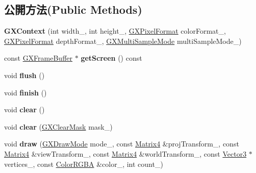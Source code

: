 \subsection*{公開方法(Public Methods)}
\begin{DoxyCompactItemize}
\item 
{\bfseries G\+X\+Context} (int width\+\_\+, int height\+\_\+, \hyperlink{class_i_dream_sky_1_1_g_x_pixel_format}{G\+X\+Pixel\+Format} color\+Format\+\_\+, \hyperlink{class_i_dream_sky_1_1_g_x_pixel_format}{G\+X\+Pixel\+Format} depth\+Format\+\_\+, \hyperlink{class_i_dream_sky_1_1_g_x_multi_sample_mode}{G\+X\+Multi\+Sample\+Mode} multi\+Sample\+Mode\+\_\+)\hypertarget{class_i_dream_sky_1_1_g_x_context_a4ec59eea395c067216c0245c6d486672}{}\label{class_i_dream_sky_1_1_g_x_context_a4ec59eea395c067216c0245c6d486672}

\item 
const \hyperlink{class_i_dream_sky_1_1_g_x_frame_buffer}{G\+X\+Frame\+Buffer} $\ast$ {\bfseries get\+Screen} () const \hypertarget{class_i_dream_sky_1_1_g_x_context_a49d48f7981f76fc3030700d9ee3e28ef}{}\label{class_i_dream_sky_1_1_g_x_context_a49d48f7981f76fc3030700d9ee3e28ef}

\item 
void {\bfseries flush} ()\hypertarget{class_i_dream_sky_1_1_g_x_context_a36462301294a68de6c99c3599e370ad0}{}\label{class_i_dream_sky_1_1_g_x_context_a36462301294a68de6c99c3599e370ad0}

\item 
void {\bfseries finish} ()\hypertarget{class_i_dream_sky_1_1_g_x_context_a9536ca0668294067af79fb6404b864de}{}\label{class_i_dream_sky_1_1_g_x_context_a9536ca0668294067af79fb6404b864de}

\item 
void {\bfseries clear} ()\hypertarget{class_i_dream_sky_1_1_g_x_context_aec5c070800c9b82965223c13ae810b88}{}\label{class_i_dream_sky_1_1_g_x_context_aec5c070800c9b82965223c13ae810b88}

\item 
void {\bfseries clear} (\hyperlink{class_i_dream_sky_1_1_g_x_clear_mask}{G\+X\+Clear\+Mask} mask\+\_\+)\hypertarget{class_i_dream_sky_1_1_g_x_context_aed4b8bad3ea948cc0168b48ecd020cf4}{}\label{class_i_dream_sky_1_1_g_x_context_aed4b8bad3ea948cc0168b48ecd020cf4}

\item 
void {\bfseries draw} (\hyperlink{class_i_dream_sky_1_1_g_x_draw_mode}{G\+X\+Draw\+Mode} mode\+\_\+, const \hyperlink{class_i_dream_sky_1_1_matrix4}{Matrix4} \&proj\+Transform\+\_\+, const \hyperlink{class_i_dream_sky_1_1_matrix4}{Matrix4} \&view\+Transform\+\_\+, const \hyperlink{class_i_dream_sky_1_1_matrix4}{Matrix4} \&world\+Transform\+\_\+, const \hyperlink{class_i_dream_sky_1_1_vector3}{Vector3} $\ast$vertices\+\_\+, const \hyperlink{class_i_dream_sky_1_1_color_r_g_b_a}{Color\+R\+G\+BA} \&color\+\_\+, int count\+\_\+)\hypertarget{class_i_dream_sky_1_1_g_x_context_a30c06e65573d46cfd20e52c764fb9f40}{}\label{class_i_dream_sky_1_1_g_x_context_a30c06e65573d46cfd20e52c764fb9f40}


\end{DoxyCompactItemize}
